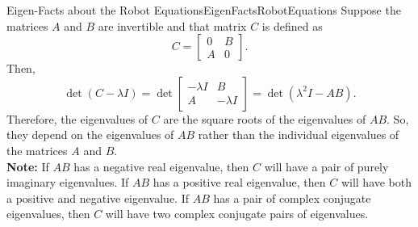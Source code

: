 \bigskip

\begin{propColor}{Eigen-Facts about the Robot Equations}{EigenFactsRobotEquations}
Suppose the matrices \( A \) and \( B \) are invertible and that matrix \( C \) is defined as
\[ C = \begin{bmatrix} 0 & B \\ A & 0 \end{bmatrix}. \]
Then, 
\[ \det(C - \lambda I) = \det\begin{bmatrix} -\lambda I & B \\ A & -\lambda I \end{bmatrix} = \det(\lambda^2 I - AB). \]
Therefore, the eigenvalues of \( C \) are the square roots of the eigenvalues of \( AB \). So, they depend on the eigenvalues of \( AB \) rather than the individual eigenvalues of the matrices \( A \) and \( B \).\\

\textbf{Note:} If $AB$ has a negative real eigenvalue, then $C$ will have a pair of purely imaginary eigenvalues.  If $AB$ has a positive real eigenvalue, then $C$ will have both a positive and negative eigenvalue. If $AB$ has a pair of complex conjugate eigenvalues, then $C$ will have two complex conjugate pairs of eigenvalues.
\end{propColor}

